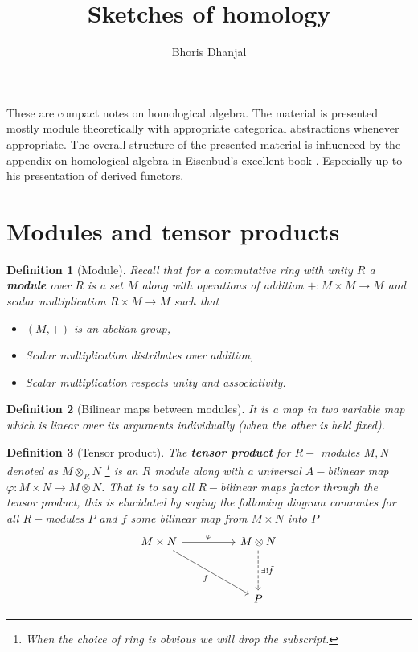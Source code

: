 \documentclass[12pt]{article}
\title{Sketches of homology}
\author{Bhoris Dhanjal}
\numberwithin{equation}{section}
\newtheorem{definition}{Definition}[section]
\begin{document}
	\tableofcontents
	\maketitle
	These are compact notes on homological algebra. The material is presented mostly module theoretically with appropriate categorical abstractions whenever appropriate. The overall structure of the presented material is influenced by the appendix on homological algebra in Eisenbud's excellent book \cite{eisenbud2013commutative}. Especially up to his presentation of derived functors. 

	\section{Modules and tensor products}
	\begin{definition}[Module]
			Recall that for a commutative ring with unity $R$ a \textbf{module} over $R$ is a set $M$ along with operations of addition $+:M\times M \to M$ and scalar multiplication $R\times M \to M$ such that 
		\begin{itemize}
			\item $(M,+)$ is an abelian group,
			\item Scalar multiplication distributes over addition,
			\item Scalar multiplication respects unity and associativity.
		\end{itemize}
	\end{definition}
	
	\begin{definition}[Bilinear maps between modules]
		It is a map in two variable map which is linear over its arguments individually (when the other is held fixed).
	\end{definition}
	
	\begin{definition}[Tensor product]
			The \textbf{tensor product} for $R-$ modules $M,N$ denoted as $M \otimes_R N$ \footnote{When the choice of ring is obvious we will drop the subscript.} is an $R$ module along with a universal $A-$bilinear map $\varphi:	M \times N \to M \otimes N$. That is to say all $R-$bilinear maps factor through the tensor product, this is elucidated by saying the following diagram commutes for all $ R-$modules $P$ and $f$ some bilinear map from $M \times N$ into $P$
		\[\begin{tikzcd}
			{M\times N} && {M\otimes N} \\
			\\
			&& P
			\arrow["\varphi", from=1-1, to=1-3]
			\arrow["f"', from=1-1, to=3-3]
			\arrow["{\exists! \tilde{f}}", dashed, from=1-3, to=3-3]
		\end{tikzcd}\]
	\end{definition}
	
\end{document}
